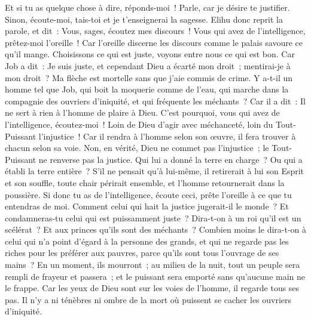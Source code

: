 \begin{multicols}{2}
Et si tu as quelque chose à dire, réponds-moi~! Parle, car je désire te justifier.
Sinon, écoute-moi, tais-toi et je t'enseignerai la sagesse.
\VerseOne{}Elihu donc reprit la parole, et dit~:
Vous, sages, écoutez mes discours~! Vous qui avez de l'intelligence, prêtez-moi l'oreille~!
Car l'oreille discerne les discours comme le palais savoure ce qu'il mange.
Choisissons ce qui est juste, voyons entre nous ce qui est bon.
Car Job a dit~: Je suis juste, et cependant Dieu a écarté mon droit~;
mentirai-je à mon droit~? Ma flèche est mortelle sans que j'aie commis de crime.
Y a-t-il un homme tel que Job, qui boit la moquerie comme de l'eau,
qui marche dans la compagnie des ouvriers d'iniquité, et qui fréquente les méchants~?
Car il a dit~: Il ne sert à rien à l'homme de plaire à Dieu.
 C'est pourquoi, vous qui avez de l'intelligence, écoutez-moi~! Loin de Dieu d'agir avec méchanceté, loin du Tout-Puissant l'injustice~!
Car il rendra à l'homme selon son œuvre, il fera trouver à chacun selon sa voie.
Non, en vérité, Dieu ne commet pas l'injustice~; le Tout-Puissant ne renverse pas la justice.
Qui lui a donné la terre en charge~? Ou qui a établi la terre entière~?
S'il ne pensait qu'à lui-même, il retirerait à lui son Esprit et son souffle,
toute chair périrait ensemble, et l'homme retournerait dans la poussière.
Si donc tu as de l'intelligence, écoute ceci, prête l'oreille à ce que tu entendras de moi.
Comment celui qui hait la justice jugerait-il le monde~? Et condamneras-tu celui qui est puissamment juste~?
Dira-t-on à un roi qu'il est un scélérat~? Et aux princes qu'ils sont des méchants~?
Combien moins le dira-t-on à celui qui n'a point d'égard à la personne des grands, et qui ne regarde pas les riches pour les préférer aux pauvres, parce qu'ils sont tous l'ouvrage de ses mains~?
En un moment, ils mourront~; au milieu de la nuit, tout un peuple sera rempli de frayeur et passera~; et le puissant sera emporté sans qu'aucune main ne le frappe.
Car les yeux de Dieu sont sur les voies de l'homme, il regarde tous ses pas.
Il n'y a ni ténèbres ni ombre de la mort où puissent se cacher les ouvriers d'iniquité.

\end{multicols}
